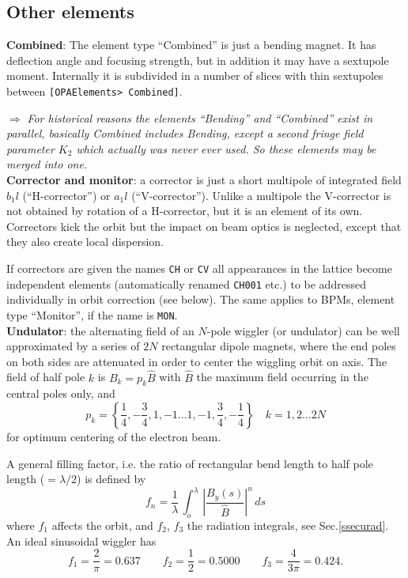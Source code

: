 \documentclass[12pt]{article}
\newcommand\beq{\begin{equation}}
\newcommand\eeq{\end{equation}}
\newcommand\todo[1]{$\Longrightarrow$ {\em #1} }
\newcommand\code[1]{{\tt [#1]}}
\begin{document}
\subsection{Other elements}
{\bf Combined}: The element type ``Combined'' is just a bending magnet. It has deflection angle and focusing strength, but in addition it may have a sextupole moment. Internally it is subdivided in a number of slices with thin sextupoles between \code{OPAElements> Combined}.

\todo{For historical reasons the elements ``Bending'' and ``Combined'' exist in parallel, basically Combined includes Bending, except a second fringe field parameter $K_2$ which actually was never ever used. So these elements may be merged into one.} \\

{\bf Corrector and monitor}: a corrector is just a short multipole of integrated field $b_1l$ (``H-corrector'') or $a_1l$ (``V-corrector''). Unlike a multipole the V-corrector is not obtained by rotation of a H-corrector, but it is an element of its own. Correctors kick the orbit but the impact on beam optics is neglected, except that they also create local dispersion.

If correctors are given the names {\tt CH} or {\tt CV} all appearances in the lattice become independent elements (automatically renamed {\tt CH001} etc.) to be addressed individually in orbit correction (see below). The same applies to BPMs, element type ``Monitor'', if the name is {\tt MON}.\\

{\bf Undulator}: the alternating field of an $N$-pole wiggler (or undulator) can be well approximated by a series of $2N$ rectangular dipole magnets, where the end poles on both sides are attenuated in order to center the wiggling orbit on axis.
The field of half pole $k$
is $B_k=p_k \hat{B}$ with $\hat{B}$ the maximum field occurring in the central poles
only, and
\[
p_k=\left\{ \frac{1}{4},-\frac{3}{4}, 1, -1\dots 1, -1, \frac{3}{4}, -\frac{1}{4}\right\}\quad k=1,2\dots 2N
\]
for optimum centering of the electron beam.

A general filling factor, i.e. the ratio of rectangular bend length to half pole length
($=\lambda/2$) is defined by
\beq\label{eq:fundu}
f_n = \frac{1}{\lambda}\,\int_o^{\lambda} \,
\left| \frac{B_y(s)}{\hat{B}}\right|^n\, ds
\eeq
where $f_1$ affects the orbit, and $f_2$, $f_3$ the radiation integrals, see Sec.\ref{ssecurad}.
An ideal sinusoidal wiggler has
\beq
f_1 = \frac{2}{\pi}=0.637 \qquad f_2 = \frac{1}{2}=0.5000 \qquad f_3 = \frac{4}{3\pi}=0.424.
\eeq \\
\end{document}
